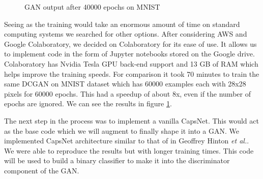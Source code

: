 \documentclass[11pt]{report}
\begin{document}
\begin{framed}
\begin{figure}
\caption{GAN output after 40000 epochs on MNIST}
\label{fig:MNIST}
\end{figure} 
Seeing as the training would take an enormous amount of time on standard computing systems we searched for other options. After considering AWS and Google Colaboratory, we decided on Colaboratory for its ease of use. It allows us to implement code in the form of Jupyter notebooks stored on the Google drive. Colaboratory has Nvidia Tesla GPU back-end support and 13 GB of RAM which helps improve the training speeds. For comparison it took 70 minutes to train the same DCGAN on MNIST dataset which has 60000 examples each with 28x28 pixels for 60000 epochs. This had a speedup of about 8x, even if the number of epochs are ignored. We can see the results in figure \ref{fig:MNIST}.\par
The next step in the process was to implement a vanilla CapsNet. This would act as the base code which we will augment to finally shape it into a GAN. We implemented CapsNet architecture similar to that of in Geoffrey Hinton \textit{et al.}\footnotemark[2]. We were able to reproduce the results but with longer training times. This code will be used to build a binary classifier to make it into the discriminator component of the GAN.
\end{framed}
\end{document}
